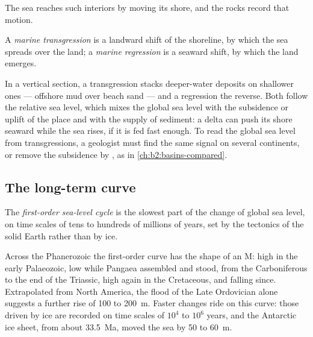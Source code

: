 The sea reaches such interiors by moving its shore, and the rocks record that motion.

\begin{definition}\label{def:b2:phanerozoic-earth:transgression}
A \emph{marine transgression} is a landward shift of the shoreline,
by which the sea spreads over the land; a \emph{marine regression} is
a seaward shift, by which the land emerges.
\end{definition}

In a vertical section, a transgression stacks deeper-water deposits on shallower ones ---
offshore mud over beach sand --- and a regression the reverse. Both follow the relative sea
level, which mixes the global sea level with the subsidence or uplift of the place and with the
supply of sediment: a delta can push its shore seaward while the sea rises, if it is fed fast
enough. To read the global sea level from transgressions, a geologist must find the same signal
on several continents, or remove the subsidence by , as in
\cref{ch:b2:basins-compared}.

\subsection*{The long-term curve}

\begin{definition}\label{def:b2:phanerozoic-earth:first-order}
The \emph{first-order sea-level cycle} is the slowest part of
the change of global sea level, on time scales of tens to hundreds of millions of years, set by
the tectonics of the solid Earth rather than by ice.
\end{definition}

Across the Phanerozoic the first-order curve has the shape of an M: high in the early Palaeozoic,
low while Pangaea assembled and stood, from the Carboniferous to the end of the Triassic, high
again in the Cretaceous, and falling since. Extrapolated from North America, the flood of the Late
Ordovician alone suggests a further rise of 100 to \qty{200}{m}.
Faster changes ride on this curve: those driven by ice are recorded on time scales of $10^4$ to
$10^6$ years, and the Antarctic ice sheet, from about \qty{33.5}{Ma}, moved the sea by 50 to
\qty{60}{m}.

